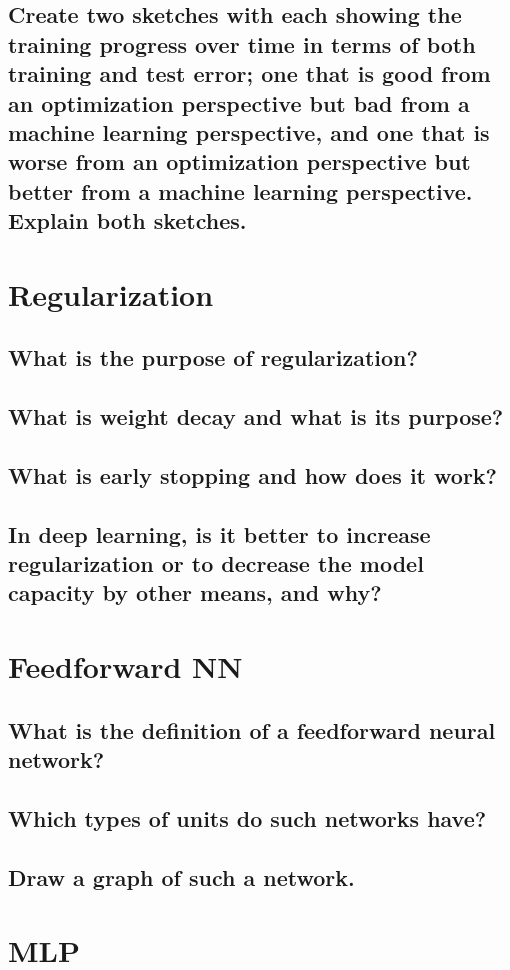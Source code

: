 \subsection{Create two sketches with each showing the training progress over time in terms of both training and test error; one that is good from an optimization perspective but bad from a machine learning perspective, and one that is worse from an optimization perspective but better from a machine learning perspective. Explain both sketches.}

\section{Regularization}
\subsection{What is the purpose of regularization?}
\subsection{What is weight decay and what is its purpose?}
\subsection{What is early stopping and how does it work?}
\subsection{In deep learning, is it better to increase regularization or to decrease the model capacity by other means, and why?}

\section{Feedforward NN}
\subsection{What is the definition of a feedforward neural network?}
\subsection{Which types of units do such networks have?}
\subsection{Draw a graph of such a network.}

\section{MLP}
